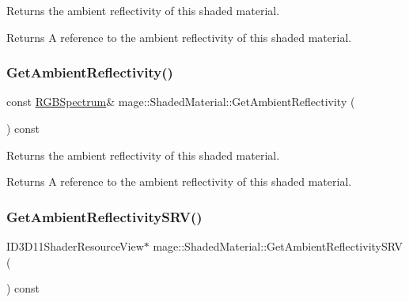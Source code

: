 Returns the ambient reflectivity of this shaded material.

\begin{DoxyReturn}{Returns}
A reference to the ambient reflectivity of this shaded material. 
\end{DoxyReturn}
\hypertarget{structmage_1_1_shaded_material_a4bb3403853e4d6ee9e443e575b33a755}{}\label{structmage_1_1_shaded_material_a4bb3403853e4d6ee9e443e575b33a755} 
\subsubsection{\texorpdfstring{Get\+Ambient\+Reflectivity()}{GetAmbientReflectivity()}\hspace{0.1cm}{\footnotesize\ttfamily [2/2]}}
{\footnotesize\ttfamily const \hyperlink{structmage_1_1_r_g_b_spectrum}{R\+G\+B\+Spectrum}\& mage\+::\+Shaded\+Material\+::\+Get\+Ambient\+Reflectivity (\begin{DoxyParamCaption}{ }\end{DoxyParamCaption}) const\hspace{0.3cm}{\ttfamily [noexcept]}}

Returns the ambient reflectivity of this shaded material.

\begin{DoxyReturn}{Returns}
A reference to the ambient reflectivity of this shaded material. 
\end{DoxyReturn}
\hypertarget{structmage_1_1_shaded_material_ae5e18984deccbd70ec76709e417b949f}{}\label{structmage_1_1_shaded_material_ae5e18984deccbd70ec76709e417b949f} 
\subsubsection{\texorpdfstring{Get\+Ambient\+Reflectivity\+S\+R\+V()}{GetAmbientReflectivitySRV()}}
{\footnotesize\ttfamily I\+D3\+D11\+Shader\+Resource\+View$\ast$ mage\+::\+Shaded\+Material\+::\+Get\+Ambient\+Reflectivity\+S\+RV (\begin{DoxyParamCaption}{ }\end{DoxyParamCaption}) const\hspace{0.3cm}{\ttfamily [noexcept]}}

